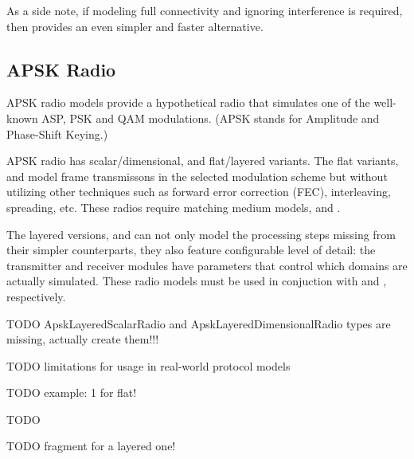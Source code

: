 As a side note, if modeling full connectivity and ignoring
interference is required, then 
provides an even simpler and faster alternative.

\subsection{APSK Radio}
\label{sec:phy:apsk-radio}

APSK radio models provide a hypothetical radio that simulates
one of the well-known ASP, PSK and QAM modulations.
(APSK stands for Amplitude and Phase-Shift Keying.)

APSK radio has scalar/dimensional, and flat/layered variants.
The flat variants,  and 
model frame transmissons in the selected modulation scheme
but without utilizing other techniques such as forward error
correction (FEC), interleaving, spreading, etc. These radios
require matching medium models, 
and .

The layered versions, 
and  can not only
model the processing steps missing from their simpler counterparts,
they also feature configurable level of detail: the transmitter
and receiver modules have  parameters that
control which domains are actually simulated.
These radio models must be used in conjuction with
 and
, respectively.

TODO ApskLayeredScalarRadio and ApskLayeredDimensionalRadio types are missing, actually create them!!! 

TODO limitations for usage in real-world protocol models

TODO example: 1 for flat!

\begin{inifile}
TODO
\end{inifile}


TODO fragment for a layered one!

